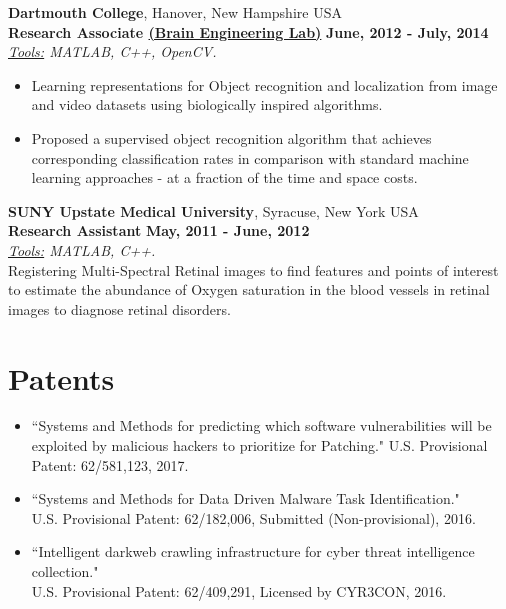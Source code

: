 \documentclass[margin,line]{CV}
\begin{document}
\begin{resume}
\begin{enumerate}
\end{enumerate}

{\bf Dartmouth College}, Hanover, New Hampshire USA\\
{\bf Research Associate \href{https://www.dartmouth.edu/~rhg/}{(Brain Engineering Lab)}} \hfill {\bf June, 2012 - July, 2014}\\
\textit{\underline{Tools:} MATLAB, C++, OpenCV.}
\begin{itemize}
	\item Learning representations for Object recognition and localization from image and video datasets using biologically inspired algorithms.
	\item Proposed a supervised object recognition algorithm that achieves corresponding classification rates in comparison with standard machine learning approaches - at a fraction of the time and space costs.
\end{itemize}
 

{\bf SUNY Upstate Medical University}, Syracuse, New York USA\\
{\bf Research Assistant} \hfill {\bf May, 2011 - June, 2012}\\
\textit{\underline{Tools:} MATLAB, C++.}\\
Registering Multi-Spectral Retinal images to find features and points of interest to estimate the abundance of Oxygen saturation in the blood vessels in retinal images to diagnose retinal disorders.

\section{\sc Patents}
\begin{itemize}[leftmargin =*]
	
\item ``Systems and Methods for predicting which software vulnerabilities will be exploited by malicious hackers to prioritize for Patching." U.S. Provisional Patent: 62/581,123, 2017.

\item ``Systems and Methods for Data Driven Malware Task Identification." \\U.S. Provisional Patent: 62/182,006, Submitted (Non-provisional), 2016. 

\item ``Intelligent darkweb crawling infrastructure for cyber threat intelligence collection."\\U.S. Provisional Patent: 62/409,291, Licensed by CYR3CON, 2016.
\end{itemize}



\end{resume}
\end{document}
